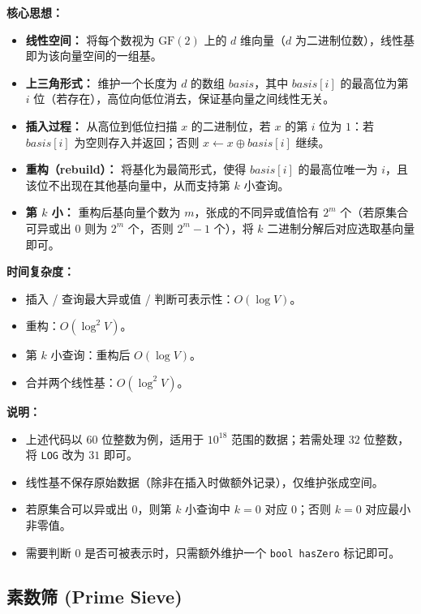\textbf{核心思想：}
\begin{itemize}
    \item \textbf{线性空间：} 将每个数视为 $\text{GF}(2)$ 上的 $d$ 维向量（$d$ 为二进制位数），线性基即为该向量空间的一组基。
    \item \textbf{上三角形式：} 维护一个长度为 $d$ 的数组 $basis$，其中 $basis[i]$ 的最高位为第 $i$ 位（若存在），高位向低位消去，保证基向量之间线性无关。
    \item \textbf{插入过程：} 从高位到低位扫描 $x$ 的二进制位，若 $x$ 的第 $i$ 位为 $1$：若 $basis[i]$ 为空则存入并返回；否则 $x \gets x \oplus basis[i]$ 继续。
    \item \textbf{重构（rebuild）：} 将基化为最简形式，使得 $basis[i]$ 的最高位唯一为 $i$，且该位不出现在其他基向量中，从而支持第 $k$ 小查询。
    \item \textbf{第 $k$ 小：} 重构后基向量个数为 $m$，张成的不同异或值恰有 $2^m$ 个（若原集合可异或出 $0$ 则为 $2^m$ 个，否则 $2^m-1$ 个），将 $k$ 二进制分解后对应选取基向量即可。
\end{itemize}

\textbf{时间复杂度：}
\begin{itemize}
    \item 插入 / 查询最大异或值 / 判断可表示性：$O(\log V)$。
    \item 重构：$O(\log^2 V)$。
    \item 第 $k$ 小查询：重构后 $O(\log V)$。
    \item 合并两个线性基：$O(\log^2 V)$。
\end{itemize}



\textbf{说明：}
\begin{itemize}
    \item 上述代码以 $60$ 位整数为例，适用于 $10^{18}$ 范围的数据；若需处理 $32$ 位整数，将 \texttt{LOG} 改为 $31$ 即可。
    \item 线性基不保存原始数据（除非在插入时做额外记录），仅维护张成空间。
    \item 若原集合可以异或出 $0$，则第 $k$ 小查询中 $k=0$ 对应 $0$；否则 $k=0$ 对应最小非零值。
    \item 需要判断 $0$ 是否可被表示时，只需额外维护一个 \texttt{bool hasZero} 标记即可。
\end{itemize}

\subsection{素数筛 (Prime Sieve)}

